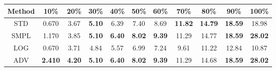 \documentclass{standalone}
\begin{document}
\begin{tabular}{c|cccccccccc}
      \toprule
      Method & 10\% & 20\% & 30\% & 40\% & 50\% & 60\% & 70\% & 80\% & 90\% & 100\% \\
      \midrule
STD & 0.670 & 3.67 & \textbf{5.10} & 6.39 & 7.40 & 8.69 & \textbf{11.82} & \textbf{14.79} & \textbf{18.59} & 18.98\\
SMPL & 1.170 & 3.85 & \textbf{5.10} & \textbf{6.40} & \textbf{8.02} & \textbf{9.39} & 11.29 & 14.77 & \textbf{18.59} & \textbf{28.02}\\
LOG & 0.670 & 3.71 & 4.84 & 5.57 & 6.99 & 7.24 & 9.61 & 11.22 & 12.84 & 10.87\\
ADV & \textbf{2.410} & \textbf{4.20} & \textbf{5.10} & \textbf{6.40} & \textbf{8.02} & \textbf{9.39} & 11.29 & 14.68 & \textbf{18.59} & \textbf{28.02}\\
  \bottomrule
\end{tabular}
\end{document}
